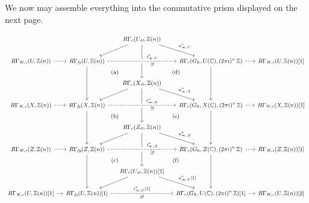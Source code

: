 We now may assemble everything into the commutative prism displayed on the next
page.

\begin{landscape}
  \vspace{\fill}

  \begin{equation}
    \label{eqn:commutative-prism-with-RGammaWc}
    \begin{tikzcd}[column sep=1em, font=\small]
      & & R\Gamma_c (U_\text{\it ét}, \ZZ (n))\ar{dl}\ar{dr}{u_{\infty,U}^*}\ar{dd} \\
      R\Gamma_\text{\it W,c} (U,\ZZ(n))\ar[dashed]{r} & R\Gamma_\text{\it fg} (U, \ZZ (n)) \ar[pos=0.65,crossing over,dashed]{rr}{i_{\infty,U}^*}[swap]{\exists!}\ar{dd}\ar[phantom]{dr}{\text{\rm\small (a)}} & & R\Gamma_c (G_\RR, U (\CC), (2\pi i)^n\,\ZZ) \ar{dd}\ar[dashed]{r} & R\Gamma_\text{\it W,c} (U,\ZZ(n)) [1] \\
      & & R\Gamma_c (X_\text{\it ét}, \ZZ (n))\ar{dl}\ar{dr}{u_{\infty,X}^*}\ar{dd}\ar[phantom]{ur}{\text{\rm\small (d)}} \\
      R\Gamma_\text{\it W,c} (X,\ZZ(n))\ar[dashed]{r} & R\Gamma_\text{\it fg} (X, \ZZ (n)) \ar[pos=0.65,crossing over,dashed]{rr}{i_{\infty,X}^*}[swap]{\exists!}\ar{dd}\ar[phantom]{dr}{\text{\rm\small (b)}} & & R\Gamma_c (G_\RR, X (\CC), (2\pi i)^n\,\ZZ) \ar{dd}\ar[dashed]{r} & R\Gamma_\text{\it W,c} (X,\ZZ(n)) [1] \\
      & & R\Gamma_c (Z_\text{\it ét}, \ZZ (n))\ar{dl}\ar{dr}{u_{\infty,Z}^*}\ar{dd}\ar[phantom]{ur}{\text{\rm\small (e)}} \\
      R\Gamma_\text{\it W,c} (Z,\ZZ(n))\ar[dashed]{r} & R\Gamma_\text{\it fg} (Z, \ZZ (n)) \ar[pos=0.65,crossing over,dashed]{rr}{i_{\infty,Z}^*}[swap]{\exists!}\ar{dd}\ar[phantom]{dr}{\text{\rm\small (c)}} & & R\Gamma_c (G_\RR, Z (\CC), (2\pi i)^n\,\ZZ) \ar{dd}\ar[dashed]{r} & R\Gamma_\text{\it W,c} (Z,\ZZ(n)) [1] \\
      & & R\Gamma_c (U_\text{\it ét}, \ZZ (n)) [1] \ar{dl}\ar{dr}{u_{\infty,U}^* [1]}\ar[phantom]{ur}{\text{\rm\small (f)}} \\
      R\Gamma_\text{\it W,c} (U,\ZZ(n)) [1]\ar[dashed]{r} & R\Gamma_\text{\it fg} (U, \ZZ (n)) [1] \ar[dashed]{rr}{i_{\infty,U}^* [1]}[swap]{\exists!} & & R\Gamma_c (G_\RR, U (\CC), (2\pi i)^n\,\ZZ) [1]\ar[dashed]{r} & R\Gamma_\text{\it W,c} (U,\ZZ(n)) [2]
    \end{tikzcd}
  \end{equation}

  \vspace{\fill}
\end{landscape}

